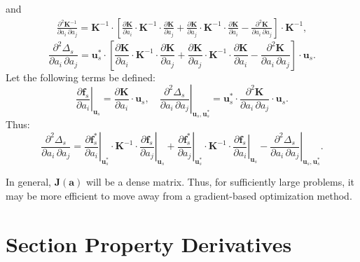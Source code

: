 \documentclass[12pt,a4paper,article]{memoir} %
\begin{document}
and
\begin{eqnarray}
        \frac{\partial^2 \mathbf{K}^{-1}}{\partial a_i \, \partial a_j} = \mathbf{K}^{-1} \cdot \left[ \frac{\partial \mathbf{K}}{\partial a_i} \cdot \mathbf{K}^{-1} \cdot \frac{\partial \mathbf{K}}{\partial a_j} + \frac{\partial \mathbf{K}}{\partial a_j} \cdot \mathbf{K}^{-1} \cdot \frac{\partial \mathbf{K}}{\partial a_i} - \frac{\partial^2 \mathbf{K}}{\partial a_i \, \partial a_j} \right] \cdot \mathbf{K}^{-1},
\end{eqnarray}
\begin{equation}
        \frac{\partial^2 \Delta_s}{\partial a_i \, \partial a_j} = \mathbf{u}^*_s \cdot \left[ \frac{\partial \mathbf{K}}{\partial a_i} \cdot \mathbf{K}^{-1} \cdot \frac{\partial \mathbf{K}}{\partial a_j} + \frac{\partial \mathbf{K}}{\partial a_j} \cdot \mathbf{K}^{-1} \cdot \frac{\partial \mathbf{K}}{\partial a_i} - \frac{\partial^2 \mathbf{K}}{\partial a_i \, \partial a_j} \right] \cdot \mathbf{u}_s.
\end{equation}
Let the following terms be defined:
\begin{equation}
  \left. \frac{\partial \mathbf{f}_s}{\partial a_i} \right|_{\mathbf{u}_s} = \frac{\partial \mathbf{K}}{\partial a_i} \cdot \mathbf{u}_s, \quad
  \left. \frac{\partial^2 \Delta_s}{\partial a_i \, \partial a_j} \right|_{\mathbf{u}_s, \mathbf{u}^*_s} = \mathbf{u}^*_s \cdot \frac{\partial^2 \mathbf{K}}{\partial a_i \, \partial a_j} \cdot \mathbf{u}_s.
\end{equation}
Thus:
\begin{equation}
  \frac{\partial^2 \Delta_s}{\partial a_i \, \partial a_j} = \left. \frac{\partial \mathbf{f}^*_s}{\partial a_i} \right|_{\mathbf{u}^*_s} \cdot \mathbf{K}^{-1} \cdot \left. \frac{\partial \mathbf{f}_s}{\partial a_j} \right|_{\mathbf{u}_s} + \left. \frac{\partial \mathbf{f}^*_s}{\partial a_j} \right|_{\mathbf{u}^*_s} \cdot \mathbf{K}^{-1} \cdot \left. \frac{\partial \mathbf{f}_s}{\partial a_i} \right|_{\mathbf{u}_s} - \left. \frac{\partial^2 \Delta_s}{\partial a_i \, \partial a_j} \right|_{\mathbf{u}_s, \mathbf{u}^*_s}.
\end{equation}

In general, $\mathbf{J} (\mathbf{a})$ will be a dense matrix. Thus, for sufficiently large problems, it may be more efficient to move away from a gradient-based optimization method.

\section{Section Property Derivatives}
\end{document}
